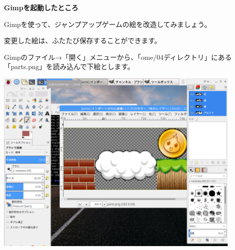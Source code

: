 \documentclass[a4paper,dvipdfmx]{jarticle}
\newcommand\textstyleqwerty[1]{#1}
\begin{document}
\bigskip


\bigskip


\bigskip


\bigskip

\textstyleqwerty{\textbf{Gimpを起動したところ}}


\bigskip


\bigskip


\bigskip

Gimpを使って、ジャンプアップゲームの絵を改造してみましょう。

変更した絵は、ふたたび保存することができます。

Gimpのファイル→「開く」メニューから、「ome/04ディレクトリ」にある「parts.png」を読み込んで下絵とします。


\bigskip



\begin{center}
\includegraphics[width=12.065cm,height=9.049cm]{text04-img/text04-img029.png}

\end{center}

\bigskip


\bigskip


\bigskip


\bigskip


\bigskip


\bigskip


\bigskip


\bigskip


\bigskip


\bigskip


\bigskip


\bigskip
\end{document}
